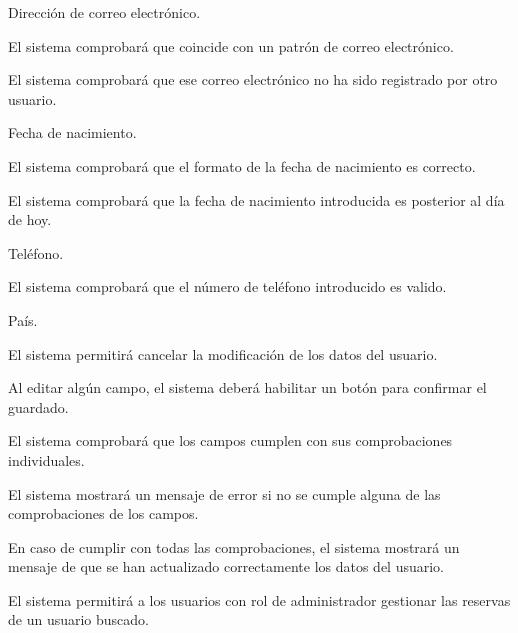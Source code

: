 \begin{enumitem}[label=\bfseries{RAdm \arabic*.},leftmargin=*]
\begin{enumitem}[label*=\bfseries{\arabic*.}]
\begin{enumitem}[label*=\bfseries{\arabic*.}]
\begin{enumitem}[label*=\bfseries{\arabic*.}]
			\end{enumitem}
			\item Dirección de correo electrónico.
			\begin{enumitem}[label*=\bfseries{\arabic*.}]
				\item El sistema comprobará que coincide con un patrón de correo electrónico.
				\item El sistema comprobará que ese correo electrónico no ha sido registrado por otro usuario.
			\end{enumitem}
			\item Fecha de nacimiento.
			\begin{enumitem}[label*=\bfseries{\arabic*.}]
				\item El sistema comprobará que el formato de la fecha de nacimiento es correcto.
				\item El sistema comprobará que la fecha de nacimiento introducida es posterior al día de hoy.
			\end{enumitem}
			\item Teléfono.
			\begin{enumitem}[label*=\bfseries{\arabic*.}]
				\item El sistema comprobará que el número de teléfono introducido es valido.
			\end{enumitem}
			\item País.
		\end{enumitem}
		\item El sistema permitirá cancelar la modificación de los datos del usuario.
		\item Al editar algún campo, el sistema deberá habilitar un botón para confirmar el guardado.
		\begin{enumitem}[label*=\bfseries{\arabic*.}]
			\item El sistema comprobará que los campos cumplen con sus comprobaciones individuales.
			\begin{enumitem}[label*=\bfseries{\arabic*.}]
				\item El sistema mostrará un mensaje de error si no se cumple alguna de las comprobaciones de los campos.
				\item En caso de cumplir con todas las comprobaciones, el sistema mostrará un mensaje de que se han actualizado correctamente los datos del usuario.
			\end{enumitem}
		\end{enumitem}
	\end{enumitem}
	\item El sistema permitirá a los usuarios con rol de administrador gestionar las reservas de un usuario buscado.

\end{enumitem}
